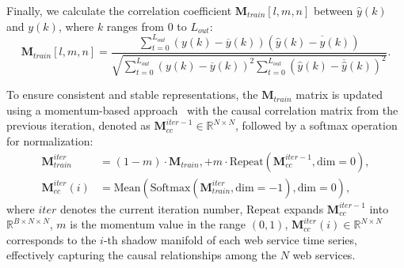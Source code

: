 Finally, we calculate the correlation coefficient \( \mathbf{M}_{train}[l, m, n] \) between \( \hat{y}(k) \) and \( y(k) \), where \( k \) ranges from \( 0 \) to \( L_{out} \):
    \begingroup
\footnotesize
\begin{equation}
    \mathbf{M}_{train}[l, m, n] = \frac{\sum_{t=0}^{L_{out}} \left( y(k) - \overline{y}(k) \right) \left( \hat{y}(k) - \overline{\hat{y}}(k) \right)}
    {\sqrt{\sum_{t=0}^{L_{out}} \left( y(k) - \overline{y}(k) \right)^2 \sum_{t=0}^{L_{out}} \left( \hat{y}(k) - \overline{\hat{y}}(k) \right)^2}}.\nonumber
\end{equation}
\endgroup






To ensure consistent and stable representations, the $\mathbf{M}_{train}$ matrix is updated using a momentum-based approach~\cite{he2020momentum} with the causal correlation matrix from the previous iteration, denoted as $\mathbf{M}^{iter-1}_{cc} \in \mathbb{R}^{N \times N}$, followed by a softmax operation for normalization:
\begin{align}
\mathbf{M}_{train}^{iter} &= (1 - m) \cdot \mathbf{M}_{train}, + m \cdot \text{Repeat}( \mathbf{M}^{iter-1}_{cc}, \text{dim}=0),\label{eq:causal_matrix_update}\\
{\mathbf{M}_{cc}^{iter}(i)} &= \text{Mean}(\text{Softmax}(\mathbf{M}_{train}^{iter}, \text{dim}=-1), \text{dim}=0),\nonumber
\end{align}
where \( iter \) denotes the current iteration number,
\( \text{Repeat} \) expands \( \mathbf{M}^{iter-1}_{cc} \) into \( \mathbb{R}^{B \times N \times N} \), $m$ is the momentum value in the range $(0,1)$, ${\mathbf{M}_{cc}^{iter}(i)} \in \mathbb{R}^{N \times N}$ corresponds to the \( i \)-th shadow manifold of each web service time series, effectively capturing the causal relationships among the \( N \) web services. 

